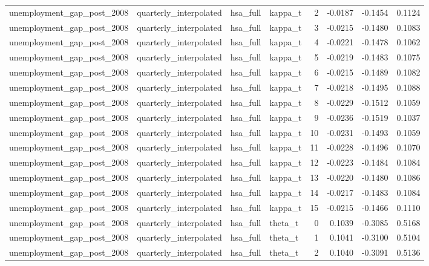 \begin{tabular}{llllrrrr}
unemployment\_gap\_post\_2008 & quarterly\_interpolated & hsa\_full & kappa\_t & 2 & -0.0187 & -0.1454 & 0.1124 \\
unemployment\_gap\_post\_2008 & quarterly\_interpolated & hsa\_full & kappa\_t & 3 & -0.0215 & -0.1480 & 0.1083 \\
unemployment\_gap\_post\_2008 & quarterly\_interpolated & hsa\_full & kappa\_t & 4 & -0.0221 & -0.1478 & 0.1062 \\
unemployment\_gap\_post\_2008 & quarterly\_interpolated & hsa\_full & kappa\_t & 5 & -0.0219 & -0.1483 & 0.1075 \\
unemployment\_gap\_post\_2008 & quarterly\_interpolated & hsa\_full & kappa\_t & 6 & -0.0215 & -0.1489 & 0.1082 \\
unemployment\_gap\_post\_2008 & quarterly\_interpolated & hsa\_full & kappa\_t & 7 & -0.0218 & -0.1495 & 0.1088 \\
unemployment\_gap\_post\_2008 & quarterly\_interpolated & hsa\_full & kappa\_t & 8 & -0.0229 & -0.1512 & 0.1059 \\
unemployment\_gap\_post\_2008 & quarterly\_interpolated & hsa\_full & kappa\_t & 9 & -0.0236 & -0.1519 & 0.1037 \\
unemployment\_gap\_post\_2008 & quarterly\_interpolated & hsa\_full & kappa\_t & 10 & -0.0231 & -0.1493 & 0.1059 \\
unemployment\_gap\_post\_2008 & quarterly\_interpolated & hsa\_full & kappa\_t & 11 & -0.0228 & -0.1496 & 0.1070 \\
unemployment\_gap\_post\_2008 & quarterly\_interpolated & hsa\_full & kappa\_t & 12 & -0.0223 & -0.1484 & 0.1084 \\
unemployment\_gap\_post\_2008 & quarterly\_interpolated & hsa\_full & kappa\_t & 13 & -0.0220 & -0.1480 & 0.1086 \\
unemployment\_gap\_post\_2008 & quarterly\_interpolated & hsa\_full & kappa\_t & 14 & -0.0217 & -0.1483 & 0.1084 \\
unemployment\_gap\_post\_2008 & quarterly\_interpolated & hsa\_full & kappa\_t & 15 & -0.0215 & -0.1466 & 0.1110 \\
unemployment\_gap\_post\_2008 & quarterly\_interpolated & hsa\_full & theta\_t & 0 & 0.1039 & -0.3085 & 0.5168 \\
unemployment\_gap\_post\_2008 & quarterly\_interpolated & hsa\_full & theta\_t & 1 & 0.1041 & -0.3100 & 0.5104 \\
unemployment\_gap\_post\_2008 & quarterly\_interpolated & hsa\_full & theta\_t & 2 & 0.1040 & -0.3091 & 0.5136 \\

\end{tabular}
